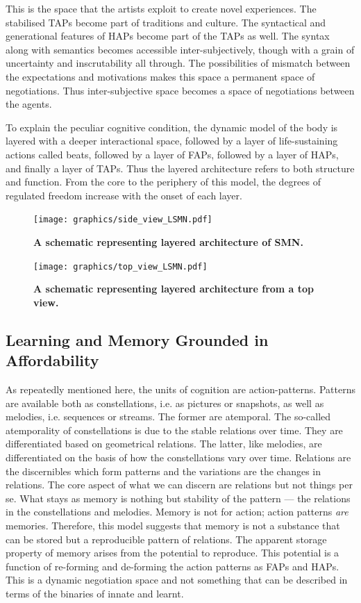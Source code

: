 {{{{{This is the space that the artists exploit to create novel experiences. The stabilised TAPs become part of traditions and culture. The syntactical and generational features of HAPs become part of the TAPs as well. The syntax along with semantics becomes accessible inter-subjectively, though with a grain of uncertainty and inscrutability all through. The possibilities of mismatch between the expectations and motivations makes this space a permanent space of negotiations. Thus inter-subjective space becomes a space of negotiations between the agents. 

To explain the peculiar cognitive condition, the dynamic model of the body is layered with a deeper interactional space, followed by a layer of life-sustaining actions called beats, followed by a layer of FAPs, followed by a layer of HAPs, and finally a layer of TAPs. Thus the layered architecture refers to both structure and function. From the core to the periphery of this model, the degrees of regulated freedom increase with the onset of each layer. 

\begin{figure}[ht] 
\texttt{[image: graphics/side\_view\_LSMN.pdf]}
\caption{\textbf{A schematic representing layered architecture of SMN.}}
\label{side_view_lSMN}
\end{figure}

\begin{figure}[ht] 
\texttt{[image: graphics/top\_view\_LSMN.pdf]}
\caption{\textbf{A schematic representing layered architecture from a top view.}}
\label{top_view_lSMN}
\end{figure}

\subsection{Learning and Memory Grounded in Affordability}
As repeatedly mentioned here, the units of cognition are action-patterns. Patterns are available both as constellations, i.e. as pictures or snapshots, as well as melodies, i.e. sequences or streams. The former are atemporal. The so-called atemporality of constellations is due to the stable relations over time. They are differentiated based on geometrical relations. The latter, like melodies, are differentiated on the basis of how the constellations vary over time. Relations are the discernibles which form patterns and the variations are the changes in relations. The core aspect of what we can discern are relations but not things per se. What stays as memory is nothing but stability of the pattern --- the relations in the constellations and melodies. Memory is not for action; action patterns \textit{are} memories. Therefore, this model suggests that memory is not a substance that can be stored but a reproducible pattern of relations. The apparent storage property of memory arises from the potential to reproduce.
This potential is a function of re-forming and de-forming the action patterns as FAPs and HAPs. This is a dynamic negotiation space and not something that can be described in terms of the binaries of innate and learnt. 

}}}}}
